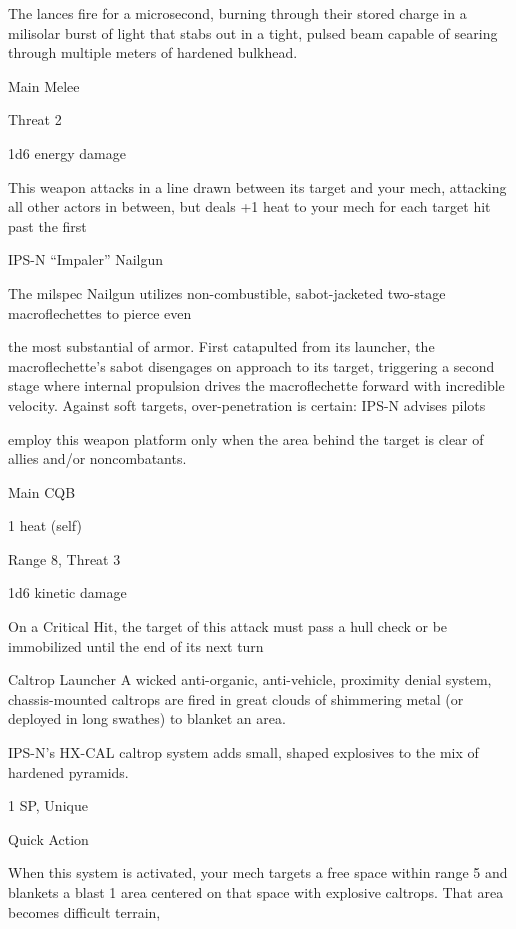 The lances fire for a microsecond, burning through their stored charge in a milisolar burst of light that stabs  
out in a tight, pulsed beam capable of searing through multiple meters of hardened bulkhead.  

Main Melee
 
Threat 2
 
1d6 energy damage
 
This weapon attacks in a line drawn between its target and your mech, attacking all other actors  
in between, but deals +1 heat to your mech for each target hit past the first
 

IPS-N “Impaler” Nailgun  

The milspec Nailgun utilizes non-combustible, sabot-jacketed two-stage macroflechettes to pierce even  

the most substantial of armor. First catapulted from its launcher, the macroflechette’s sabot disengages on  
approach to its target, triggering a second stage where internal propulsion drives the macroflechette  
forward with incredible velocity. Against soft targets, over-penetration is certain: IPS-N advises pilots  

employ this weapon platform only when the area behind the target is clear of allies and/or noncombatants.   

Main CQB
 
1 heat (self)
 
Range 8, Threat 3
 
1d6 kinetic damage
 
On a Critical Hit, the target of this attack must pass a hull check or be immobilized until the end  
of its next turn
 

Caltrop Launcher  
A wicked anti-organic, anti-vehicle, proximity denial system, chassis-mounted caltrops are fired in great  
clouds of shimmering metal (or deployed in long swathes) to blanket an area.   

IPS-N’s HX-CAL caltrop system adds small, shaped explosives to the mix of hardened pyramids.  

1 SP, Unique
 
Quick Action
 
When this system is activated, your mech targets a free space within range 5 and blankets a  
blast 1 area centered on that space with explosive caltrops. That area becomes difficult terrain,  

                                                                                                                     


